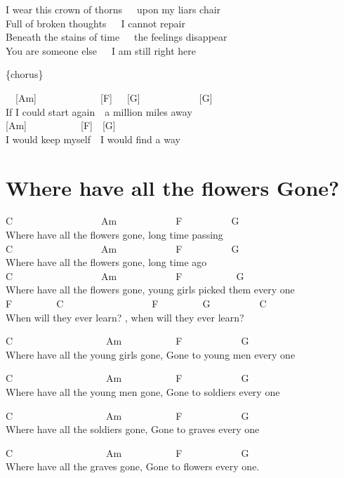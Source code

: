 \documentclass[
  letterpaper,
]{scrbook}
\begin{document}
I wear this crown of thorns~~~upon my liar\textquotesingle s chair\\
Full of broken thoughts~~~I cannot repair\\
Beneath the stains of time~~~the feelings disappear\\
You are someone else~~~I am still right here

\{chorus\}

~~{[}Am{]}~~~~~~~~~~~~~{[}F{]}~~~{[}G{]}~~~~~~~~~~~~{[}G{]}\\
If I could start again~~a million miles away\\
{[}Am{]}~~~~~~~~~~~{[}F{]}~~{[}G{]}\\
I would keep myself~~I would find a way

\hypertarget{where-have-all-the-flowers-gone}{%
\chapter{Where have all the flowers
Gone?}\label{where-have-all-the-flowers-gone}}

C~~~~~~~~~~~~~~~~~~Am~~~~~~~~~~~~F~~~~~~~~~~G\\
Where have all the flowers gone, long time passing\\
C~~~~~~~~~~~~~~~~~~Am~~~~~~~~~~~~F~~~~~~~~~~G\\
Where have all the flowers gone, long time ago\\
C~~~~~~~~~~~~~~~~~~Am~~~~~~~~~~~~F~~~~~~~~~~~G\\
Where have all the flowers gone, young girls picked them every one\\
F~~~~~~~~~C~~~~~~~~~~~~~~~~~~F~~~~~~~~~G~~~~~~~~~~C~~~\\
When will they ever learn? , when will they ever learn?

C~~~~~~~~~~~~~~~~~~~Am~~~~~~~~~~~F~~~~~~~~~~~~G\\
Where have all the young girls gone, Gone to young men every one

C~~~~~~~~~~~~~~~~~~~Am~~~~~~~~~~~F~~~~~~~~~~~~G\\
Where have all the young men gone, Gone to soldiers every one

C~~~~~~~~~~~~~~~~~~~Am~~~~~~~~~~~F~~~~~~~~~~~~G~~~\\
Where have all the soldiers gone, Gone to graves every one

C~~~~~~~~~~~~~~~~~~~Am~~~~~~~~~~~F~~~~~~~~~~~~G~~\\
Where have all the graves gone, Gone to flowers every one.
\end{document}
